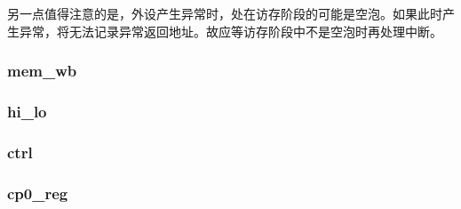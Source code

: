 \documentclass{article}
\begin{document}
\begin{spacing}{1.4}
另一点值得注意的是，外设产生异常时，处在访存阶段的可能是空泡。如果此时产生异常，将无法记录异常返回地址。故应等访存阶段中不是空泡时再处理中断。

\subsubsection{mem\_wb}
\subsubsection{hi\_lo}
\subsubsection{ctrl}
\subsubsection{cp0\_reg}


\end{spacing}
\end{document}
